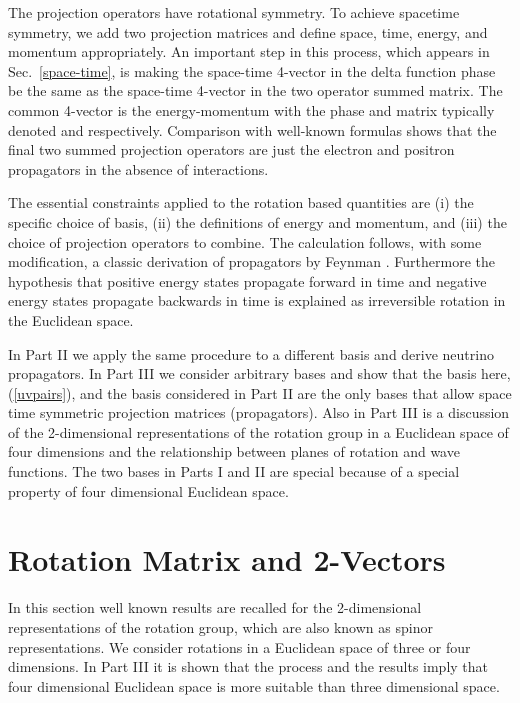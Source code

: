 \documentclass[a4paper,12pt]{article}
\begin{document}
	The projection operators have rotational symmetry. To achieve spacetime symmetry, we add two projection matrices and define space, time, energy, and momentum appropriately. An important step in this process, which appears in Sec.~\ref{space-time}, is making the space-time 4-vector in the delta function phase be the same as the space-time 4-vector in the two operator summed matrix. The common 4-vector is the energy-momentum with the phase and matrix typically denoted \coordHE{} and  \coordHE{} respectively. Comparison with well-known formulas shows that the final two summed projection operators are just the electron and positron propagators in the absence of interactions.


	The essential constraints applied to the rotation based quantities are (i) the specific choice of basis, (ii) the definitions of energy and momentum, and (iii) the choice of projection operators to combine. The calculation follows, with some modification, a classic derivation of propagators by Feynman \cite{feynman1}. Furthermore the hypothesis that positive energy states propagate forward in time and negative energy states propagate backwards in time is explained as irreversible rotation in the Euclidean space.

	In Part II we apply the same procedure to a different basis and derive neutrino propagators. In Part III we consider arbitrary bases and show that the  \coordHE{} basis here, (\ref{uvpairs}), and the basis considered in Part II are the only bases that allow space time symmetric projection matrices (propagators). Also in Part III is a discussion of the 2-dimensional representations of the rotation group in a Euclidean space of four dimensions and the relationship between planes of rotation and wave functions. The two bases in Parts I and II are special because of a special property of four dimensional Euclidean space.



\section{Rotation Matrix and 2-Vectors} \label{2d} %

	In this section well known results are recalled for the 2-dimensional representations of the rotation group, which are also known as spinor representations. We consider rotations in a Euclidean space of three or four dimensions. In Part III it is shown that the process and the results imply that four dimensional Euclidean space is more suitable than three dimensional space.  
\end{document}
